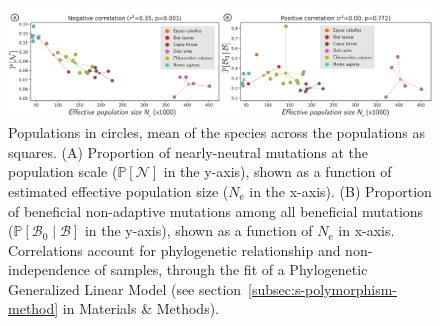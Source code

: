 \documentclass{article}
\newcommand{\Ne}{N_{\text{e}}}
\newcommand{\proba}{\mathbb{P}}
\newcommand{\SphyBen}{\mathcal{B}_0}
\newcommand{\given}{\mid}
\newcommand{\SpopNeu}{\mathcal{N}}
\newcommand{\SpopBen}{\mathcal{B}}
\begin{document}
    \begin{figure}[!ht]
        \centering
        \includegraphics[width=\textwidth, page=1] {artworks/figure.diversity}
        \caption{
            Populations in circles, mean of the species across the populations as squares.
            (A) Proportion of nearly-neutral mutations at the population scale ($\proba [ \SpopNeu]$ in the y-axis), shown as a function of estimated effective population size ($\Ne$ in the x-axis).
            (B) Proportion of beneficial non-adaptive mutations among all beneficial mutations ($\proba [ \SphyBen \given \SpopBen]$ in the y-axis), shown as a function of $\Ne$ in x-axis.
            Correlations account for phylogenetic relationship and non-independence of samples, through the fit of a Phylogenetic Generalized Linear Model (see section~\ref{subsec:s-polymorphism-method} in Materials \& Methods).
        }
        \label{fig:diversity}
    \end{figure}
\end{document}
